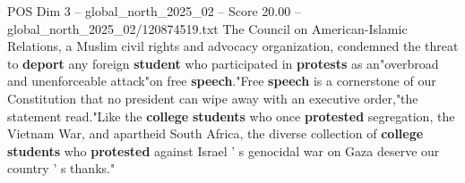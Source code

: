 \begin{textsample}{POS Dim 3 – global\_north\_2025\_02 – Score 20.00 – global\_north\_2025\_02/120874519.txt}
The Council on American-Islamic Relations, a Muslim civil rights and advocacy organization, condemned the threat to \textbf{deport} any foreign \textbf{student} who participated in \textbf{protests} as an"overbroad and unenforceable attack"on free \textbf{speech}."Free \textbf{speech} is a cornerstone of our Constitution that no president can wipe away with an executive order,"the statement read."Like the \textbf{college} \textbf{students} who once \textbf{protested} segregation, the Vietnam War, and apartheid South Africa, the diverse collection of \textbf{college} \textbf{students} who \textbf{protested} against Israel ' s genocidal war on Gaza deserve our country ' s thanks."

\end{textsample}

